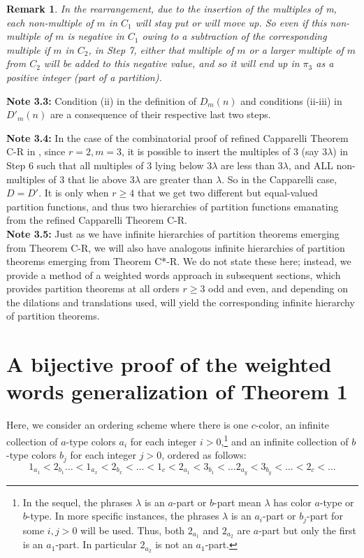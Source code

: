\documentclass[12pt,a4paper]{amsart}
\newtheorem{remark}{Remark}
\theoremstyle{definition}
\theoremstyle{notation}
\theoremstyle{corollary}
\begin{document}
\begin{remark} In the rearrangement, due to the insertion of the multiples of m, each non-multiple of $m$ in $C_1$ will stay put or will move up. So even if this non-multiple of $m$ is negative in $C_1$ owing to a subtraction of the corresponding multiple if $m$ in $C_2$, in Step 7, either that multiple of $m$ or a larger multiple of $m$ from $C_2$ will be added to this negative value, and so it will end up in $\pi_3$ as a positive integer (part of a partition).\end{remark}

\bigskip

\textbf{Note 3.3:} Condition (ii) in the definition of $D_m(n)$ and conditions (ii-iii) in $D'_m(n)$ are a consequence of their respective last two steps.
\medskip

\textbf{Note 3.4:} In the case of the combinatorial proof of refined Capparelli
Theorem C-R  in \cite{KAGEABG95}, since $r=2, m=3$, it is possible
to insert the multiples of 3 (say $3\lambda$) in Step 6 such that all multiples of $3$ lying below $3\lambda$ are less than $3\lambda$, and ALL non-multiples of
$3$ that lie above $3\lambda $ are greater than $\lambda $. So in the
Capparelli case, $D=D'$. It is only when $r\ge 4$ that we get two different but
equal-valued partition functions, and thus two hierarchies of partition functions emanating from the refined Capparelli Theorem C-R.\\ 

\textbf{Note 3.5:} Just as we have infinite hierarchies of partition theorems emerging from Theorem C-R, we will also have analogous infinite hierarchies of partition theorems emerging from Theorem C*-R. We do not state these here; instead, we provide a method of a weighted words approach in subsequent sections, which provides partition theorems at all orders $r\ge 3$ odd and even, and depending on the dilations and translations used, will yield the corresponding infinite hierarchy of partition theorems. 



\section{A bijective proof of the weighted words generalization of Theorem 1}

Here, we consider an ordering scheme where there is one $c$-color, an infinite collection of $a$-type colors $a_i$ for each integer $i>0$,\footnote{In the sequel, the phrases $\lambda$ is an $a$-part or $b$-part mean $\lambda$ has color $a$-type or $b$-type. In more specific instances, the phrases $\lambda$ is an $a_i$-part or $b_j$-part for some $i,j>0$ will be used. Thus, both $2_{a_1}$ and $2_{a_2}$ are $a$-part but only the first is an $a_1$-part. In particular $2_{a_2}$ is not an $a_1$-part.} and an infinite collection of $b$-type colors $b_j$ for each integer $j>0$, ordered as follows:
$$1_{a_1}<2_{b_1}\dots<1_{a_{x}}<2_{b_x}<\dots<1_c<2_{a_1}<3_{b_1}<\dots2_{a_y}<3_{b_y}<\dots<2_c<\dots$$
\end{document}
